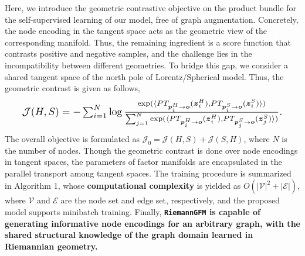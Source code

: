 Here, we introduce the geometric contrastive objective on the product bundle for the self-supervised learning of our model, free of graph augmentation.
Concretely, the node encoding in the tangent space acts as the geometric view of the corresponding manifold.
Thus, the remaining ingredient is a score function that contrasts positive and negative samples, and the challenge lies in the incompatibility between different geometries.
To bridge this gap, we consider a shared tangent space of the north pole of Lorentz/Spherical model.
Thus, the geometric contrast is given as follows,
  \vspace{-0.07in}
\begin{align}
\label{eq:loss}
\resizebox{0.922\hsize}{!}{$
    \mathcal{J}(H, S) = -\sum_{i=1}^N \log\frac{\exp(\langle PT_{\boldsymbol p^H_i \to \boldsymbol o}(\boldsymbol z^H_i), PT_{\boldsymbol p^S_i \to \boldsymbol o}(\boldsymbol z^S_i)\rangle)}{\sum_{j=1}^N \exp(\langle PT_{\boldsymbol p^H_i \to \boldsymbol o}(\boldsymbol z^H_i), PT_{\boldsymbol p^S_j \to \boldsymbol o}(\boldsymbol z^S_j)\rangle)}.
    $}
      \vspace{-0.12in}
\end{align}
The overall objective is formulated as  $\mathcal{J}_0= \mathcal{J}(H, S)+\mathcal{J}(S,H)$, where $N$ is the number of nodes.
Though the geometric contrast is done over node encodings in tangent spaces, the parameters of factor manifolds are encapsulated in the parallel transport among tangent spaces.
The training procedure is summarized in Algorithm 1, 
whose \textbf{computational complexity} is yielded as $O(|\mathcal V|^2+|\mathcal E|)$, where $\mathcal V$ and  $\mathcal E$ are the node set and edge set, respectively, and the proposed model supports minibatch training.
Finally, \textbf{\texttt{RiemannGFM}
is capable of generating informative node encodings for an arbitrary graph, with the shared structural knowledge of }\textbf{the graph domain learned in Riemannian geometry.}






